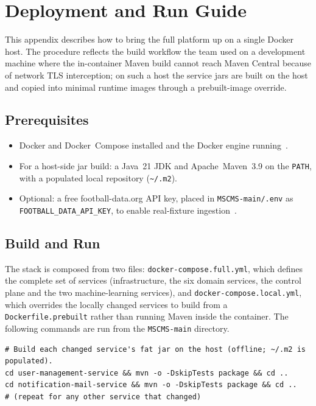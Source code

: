 \chapter{Deployment and Run Guide}
\label{app:deploy}

This appendix describes how to bring the full platform up on a single Docker host. The
procedure reflects the build workflow the team used on a development machine where the
in-container Maven build cannot reach Maven Central because of network TLS interception; on
such a host the service jars are built on the host and copied into minimal runtime images
through a prebuilt-image override.

\section{Prerequisites}
\label{app:deploy-prereq}

\begin{itemize}
  \item Docker and Docker~Compose installed and the Docker engine running~\cite{docker}.
  \item For a host-side jar build: a Java~21 JDK and Apache~Maven~3.9 on the \texttt{PATH},
        with a populated local repository (\texttt{\textasciitilde/.m2}).
  \item Optional: a free football-data.org API key, placed in \texttt{MSCMS-main/.env} as
        \texttt{FOOTBALL\_DATA\_API\_KEY}, to enable real-fixture ingestion~\cite{footballdata}.
\end{itemize}

\section{Build and Run}
\label{app:deploy-run}

The stack is composed from two files: \texttt{docker-compose.full.yml}, which defines the
complete set of services (infrastructure, the six domain services, the control plane and the
two machine-learning services), and \texttt{docker-compose.local.yml}, which overrides the
locally changed services to build from a \texttt{Dockerfile.prebuilt} rather than running
Maven inside the container. The following commands are run from the \texttt{MSCMS-main}
directory.

\begin{lstlisting}[language=bashx,caption={Building service jars on the host (offline).},label={lst:hostbuild}]
# Build each changed service's fat jar on the host (offline; ~/.m2 is populated).
cd user-management-service && mvn -o -DskipTests package && cd ..
cd notification-mail-service && mvn -o -DskipTests package && cd ..
# (repeat for any other service that changed)
\end{lstlisting}

